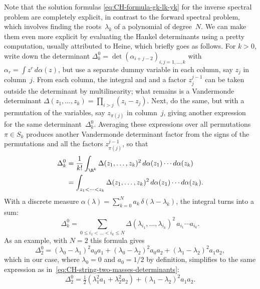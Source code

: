 \documentclass[10pt,a4paper]{article} \pdfoutput=1 
\begin{document}
Note that the solution formulas \eqref{eq:CH-formula-gk-lk-yk} for the inverse spectral
problem are completely explicit,
in contrast to the forward spectral problem, which involves finding the roots~$\lambda_k$
of a polynomial of degree~$N$.
We can make them even more explicit by evaluating the Hankel determinants
using a pretty computation, usually attributed to Heine, which briefly goes as follows.
For $k>0$, write down the determinant $\Delta_k^0 = \det(\alpha_{i+j-2})_{i,j=1,\dots,k}$ with
$\alpha_r = \int z^r \, d\alpha(z)$,
but use a separate dummy variable in each column, say $z_j$ in column~$j$.
From each column, the integral and and a factor $z_j^{j-1}$
can be taken outside the determinant by multilinearity;
what remains is a Vandermonde determinant
$\Delta(z_1,\dots,z_k) = \prod_{i > j} (z_i - z_j)$.
Next, do the same, but with a permutation of the variables, say $z_{\pi(j)}$ in column~$j$,
giving another expression for the same determinant~$\Delta_k^0$.
Averaging these expressions over all permutations $\pi \in S_k$ produces another
Vandermonde determinant factor
from the signs of the permutations and all the factors $z_{\pi(j)}^{j-1}$,
so that
\begin{equation}
  \begin{split}
    \Delta_k^0
    &
    = \frac{1}{k!} \int_{\R^k} \Delta(z_1,\dots,z_k)^2 \, d\alpha(z_1) \dotsm d\alpha(z_k)
    \\ &
    = \int_{z_1 < \dots < z_k} \Delta(z_1,\dots,z_k)^2 \, d\alpha(z_1) \dotsm d\alpha(z_k)
    .
  \end{split}
\end{equation}
With a discrete measure
$\alpha(\lambda) = \sum_{k=0}^N a_k \, \delta(\lambda-\lambda_k)$,
the integral turns into a sum:
\begin{equation}
  \label{eq:CH-delta-zero-heine}
  \Delta_k^0 =
  \sum_{0 \le i_1 < \dots < i_k \le N} \Delta(\lambda_{i_1},\dots,\lambda_{i_k})^2 \, a_{i_1} \dotsm a_{i_k}
  .
\end{equation}
As an example, with $N=2$ this formula gives
\begin{equation*}
  \Delta_2^0
  = (\lambda_0 - \lambda_1)^2 a_0 a_1 + (\lambda_0 - \lambda_2)^2 a_0 a_2 + (\lambda_1 - \lambda_2)^2 a_1 a_2
  ,
\end{equation*}
which in our case, where $\lambda_0=0$ and $a_0=1/2$ by definition,
simplifies to the same expression as in~\eqref{eq:CH-string-two-masses-determinants}:
\begin{equation*}
  \Delta_2^0
  = \tfrac12 ( \lambda_1^2 a_1 + \lambda_2^2 a_2 ) + (\lambda_1 - \lambda_2)^2 a_1 a_2
  .
\end{equation*}
\end{document}
